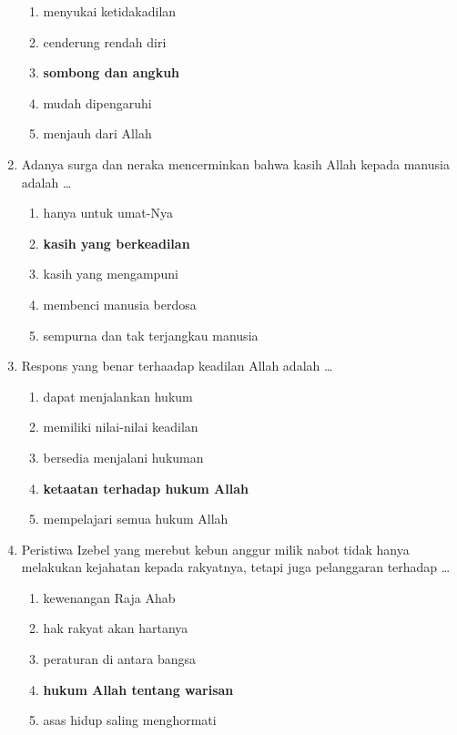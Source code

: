 \documentclass[12pt]{article}
\begin{document}
\begin{enumerate}
\begin{enumerate}
                \item menyukai ketidakadilan
                \item cenderung rendah diri
                \item \textbf{sombong dan angkuh}
                \item mudah dipengaruhi
                \item menjauh dari Allah
            \end{enumerate}
        \item Adanya surga dan neraka mencerminkan bahwa kasih Allah kepada manusia adalah \dots
            \begin{enumerate}
                \item hanya untuk umat-Nya
                \item \textbf{kasih yang berkeadilan}
                \item kasih yang mengampuni
                \item membenci manusia berdosa
                \item sempurna dan tak terjangkau manusia
            \end{enumerate}
        \item Respons yang benar terhaadap keadilan Allah adalah \dots
            \begin{enumerate}
                \item dapat menjalankan hukum 
                \item memiliki nilai-nilai keadilan 
                \item bersedia menjalani hukuman 
                \item \textbf{ketaatan terhadap hukum Allah}
                \item mempelajari semua hukum Allah 
            \end{enumerate}
        \item Peristiwa Izebel yang merebut kebun anggur milik nabot tidak hanya
            melakukan kejahatan kepada rakyatnya, tetapi juga pelanggaran terhadap \dots
            \begin{enumerate}
                \item kewenangan Raja Ahab 
                \item hak rakyat akan hartanya 
                \item peraturan di antara bangsa
                \item \textbf{hukum Allah tentang warisan}
                \item asas hidup saling menghormati

\end{enumerate}
\end{enumerate}
\end{document}
